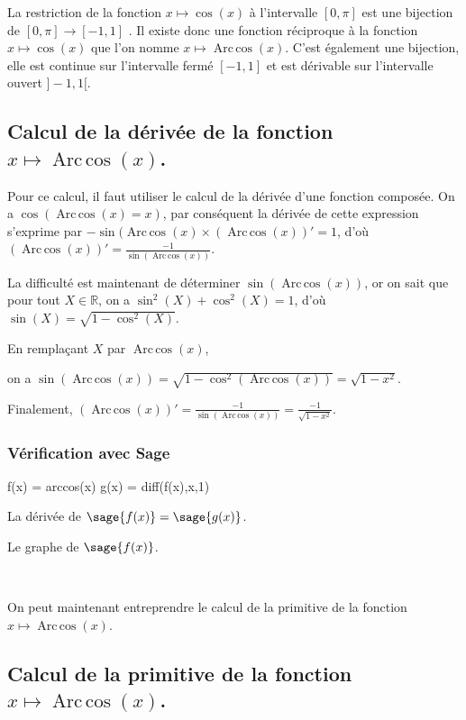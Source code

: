 \documentclass[a4paper,14pt]{extreport} %
\def\eclaire{\mathbb}
\def\R{\ensuremath{\eclaire R}}
\renewcommand{\arccos}{\mathop{\mathrm{Arc\,cos}}}
\begin{document}
La restriction de la fonction $x \mapsto \cos(x) $ à l'intervalle $[0,\pi]$ est une bijection de $[0,\pi] \rightarrow [-1,1]$ . Il existe donc une fonction réciproque à la fonction $x \mapsto \cos(x) $ que l'on nomme $x \mapsto \arccos(x) $. C'est également une bijection, elle est continue sur l'intervalle fermé  $ [-1,1]$ et est dérivable sur l'intervalle ouvert $]-1,1[$.

\subsection{Calcul de la dérivée de la fonction $x \mapsto \arccos(x) $.}

Pour ce calcul, il faut utiliser le calcul de la dérivée d'une fonction composée. On a $\cos(\arccos(x)=x)$, par conséquent la dérivée de cette expression s'exprime par $ -\sin(\arccos(x) \times (\arccos(x))' = 1$, d'où $(\arccos(x))' = \frac{-1}{\sin(\arccos(x))} $.

La difficulté est maintenant de déterminer $\sin(\arccos(x))$, or on sait que pour tout $X \in \R$, on a $\sin^2(X) + \cos^2(X) = 1$, d'où $\sin(X) = \sqrt{1-\cos^2(X)}$.

En remplaçant $X$ par $\arccos(x)$, 

on a $\sin(\arccos(x)) = \sqrt{1-\cos^2(\arccos(x))} = \sqrt{1- x^2}$.

Finalement, $(\arccos(x))' = \frac{-1}{\sin(\arccos(x))} =  \frac{-1}{\sqrt{1- x^2}} $.

\subsubsection{Vérification avec Sage}

\begin{sageblock}
    f(x) = arccos(x)
    g(x) = diff(f(x),x,1)
\end{sageblock}

La dérivée de $\sage{f(x)} = \sage{g(x)} $.

Le graphe de $\sage{f(x)} $.


\begin{center}
 \\
\end{center}


On peut maintenant entreprendre le calcul de la primitive de la  fonction  $x \mapsto \arccos(x) $.

\subsection{Calcul de la primitive de la fonction  $x \mapsto \arccos(x) $.}
\end{document}
